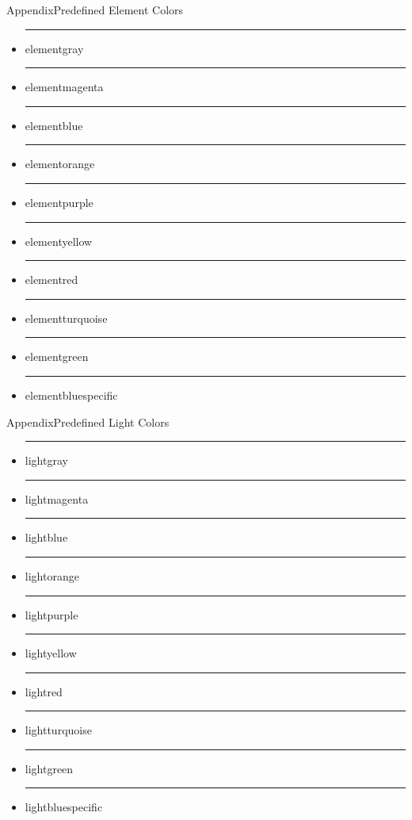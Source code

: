 \documentclass{beamer}
\begin{document}
\begin{frame}{Appendix}{Predefined Element Colors}
	\begin{itemize}
		\item {\color{elementgray}\rule{.7cm}{.4cm} elementgray}
		\item {\color{elementmagenta}\rule{.7cm}{.4cm} elementmagenta}
		\item {\color{elementblue}\rule{.7cm}{.4cm} elementblue}
		\item {\color{elementorange}\rule{.7cm}{.4cm} elementorange}
		\item {\color{elementpurple}\rule{.7cm}{.4cm} elementpurple}
		\item {\color{elementyellow}\rule{.7cm}{.4cm} elementyellow}
		\item {\color{elementred}\rule{.7cm}{.4cm} elementred}
		\item {\color{elementturquoise}\rule{.7cm}{.4cm} elementturquoise}
		\item {\color{elementgreen}\rule{.7cm}{.4cm} elementgreen}
		\item {\color{elementbluespecific}\rule{.7cm}{.4cm} elementbluespecific}
	\end{itemize}
\end{frame}

\begin{frame}{Appendix}{Predefined Light Colors}
	\begin{itemize}
		\item {\color{lightgray}\rule{.7cm}{.4cm} lightgray}
		\item {\color{lightmagenta}\rule{.7cm}{.4cm} lightmagenta}
		\item {\color{lightblue}\rule{.7cm}{.4cm} lightblue}
		\item {\color{lightorange}\rule{.7cm}{.4cm} lightorange}
		\item {\color{lightpurple}\rule{.7cm}{.4cm} lightpurple}
		\item {\color{lightyellow}\rule{.7cm}{.4cm} lightyellow}
		\item {\color{lightred}\rule{.7cm}{.4cm} lightred}
		\item {\color{lightturquoise}\rule{.7cm}{.4cm} lightturquoise}
		\item {\color{lightgreen}\rule{.7cm}{.4cm} lightgreen}
		\item {\color{lightbluespecific}\rule{.7cm}{.4cm} lightbluespecific}
	\end{itemize}
\end{frame}
\end{document}
